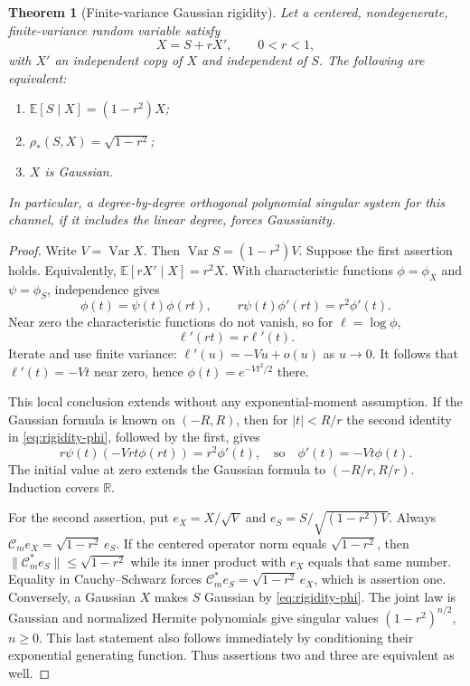 \documentclass[11pt,a4paper]{article}
\numberwithin{equation}{section}
\newtheorem{theorem}{Theorem}[section]
\theoremstyle{definition}\newtheorem{definition}[theorem]{Definition}
\theoremstyle{remark}\newtheorem{remark}[theorem]{Remark}
\newcommand{\R}{\mathbb R}\newcommand{\C}{\mathbb C}
\newcommand{\E}{\mathbb E}\newcommand{\Pp}{\mathbb P}
\newcommand{\Var}{\operatorname{Var}}\newcommand{\Cov}{\operatorname{Cov}}
\newcommand{\calC}{\mathcal C_m}\newcommand{\calP}{\mathcal P}
\newcommand{\norm}[1]{\lVert #1\rVert}
\begin{document}
\begin{theorem}[Finite-variance Gaussian rigidity]
\label{thm:gaussian}
Let a centered, nondegenerate, finite-variance random variable satisfy
\[
 X=S+rX',\qquad 0<r<1,
\]
with $X'$ an independent copy of $X$ and independent of $S$. The following are equivalent:
\begin{enumerate}
\item $\E[S\mid X]=(1-r^2)X$;
\item $\rho_*(S,X)=\sqrt{1-r^2}$;
\item $X$ is Gaussian.
\end{enumerate}
In particular, a degree-by-degree orthogonal polynomial singular system for this channel, if it includes the linear degree, forces Gaussianity.
\end{theorem}
\begin{proof}
Write $V=\Var X$. Then $\Var S=(1-r^2)V$. Suppose the first assertion holds. Equivalently, $\E[rX'\mid X]=r^2X$. With characteristic functions $\phi=\phi_X$ and $\psi=\phi_S$, independence gives
\begin{equation}
 \phi(t)=\psi(t)\phi(rt),\qquad
 r\psi(t)\phi'(rt)=r^2\phi'(t).
 \label{eq:rigidity-phi}
\end{equation}
Near zero the characteristic functions do not vanish, so for $\ell=\log\phi$,
\[
 \ell'(rt)=r\ell'(t).
\]
Iterate and use finite variance: $\ell'(u)=-Vu+o(u)$ as $u\to0$. It follows that $\ell'(t)=-Vt$ near zero, hence $\phi(t)=e^{-Vt^2/2}$ there.

This local conclusion extends without any exponential-moment assumption. If the Gaussian formula is known on $(-R,R)$, then for $|t|<R/r$ the second identity in \eqref{eq:rigidity-phi}, followed by the first, gives
\[
 r\psi(t)(-Vrt\phi(rt))=r^2\phi'(t),
 \quad\text{so}\quad \phi'(t)=-Vt\phi(t).
\]
The initial value at zero extends the Gaussian formula to $(-R/r,R/r)$. Induction covers $\R$.

For the second assertion, put $e_X=X/\sqrt V$ and $e_S=S/\sqrt{(1-r^2)V}$. Always $\calC e_X=\sqrt{1-r^2}\,e_S$. If the centered operator norm equals $\sqrt{1-r^2}$, then $\norm{\calC^*e_S}\le\sqrt{1-r^2}$ while its inner product with $e_X$ equals that same number. Equality in Cauchy--Schwarz forces $\calC^*e_S=\sqrt{1-r^2}\,e_X$, which is assertion one. Conversely, a Gaussian $X$ makes $S$ Gaussian by \eqref{eq:rigidity-phi}. The joint law is Gaussian and normalized Hermite polynomials give singular values $(1-r^2)^{n/2}$, $n\ge0$. This last statement also follows immediately by conditioning their exponential generating function. Thus assertions two and three are equivalent as well.
\end{proof}
\end{document}

